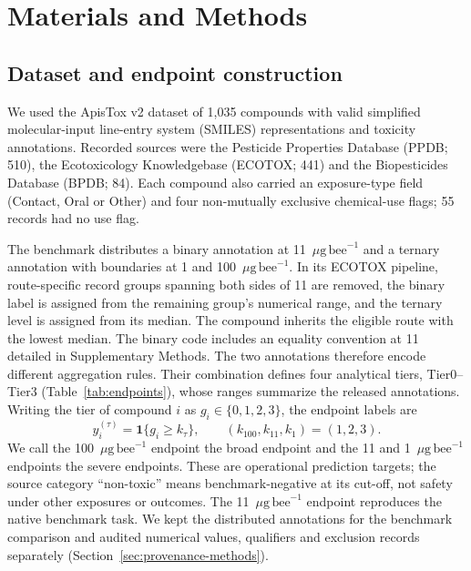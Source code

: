 \documentclass{ieeeaccess}
\newcommand{\ugbee}{\ensuremath{\mu\mathrm{g\,bee}^{-1}}\xspace}
\begin{document}
\section{Materials and Methods}
\subsection{Dataset and endpoint construction}
We used the ApisTox v2 dataset of 1,035 compounds with valid simplified molecular-input line-entry system (SMILES) representations and toxicity annotations\cite{Adamczyk2025}. Recorded sources were the Pesticide Properties Database (PPDB; 510)\cite{Lewis2016}, the Ecotoxicology Knowledgebase (ECOTOX; 441) and the Biopesticides Database (BPDB; 84). Each compound also carried an exposure-type field (Contact, Oral or Other) and four non-mutually exclusive chemical-use flags; 55 records had no use flag.

The benchmark distributes a binary annotation at 11~\ugbee and a ternary annotation with boundaries at 1 and 100~\ugbee\cite{Adamczyk2025}. In its ECOTOX pipeline, route-specific record groups spanning both sides of 11 are removed, the binary label is assigned from the remaining group's numerical range, and the ternary level is assigned from its median. The compound inherits the eligible route with the lowest median. The binary code includes an equality convention at 11 detailed in Supplementary Methods. The two annotations therefore encode different aggregation rules. Their combination defines four analytical tiers, Tier0--Tier3 (Table~\ref{tab:endpoints}), whose ranges summarize the released annotations. Writing the tier of compound \(i\) as \(g_i\in\{0,1,2,3\}\), the endpoint labels are
\begin{equation}
y_i^{(\tau)}=\mathbf{1}\{g_i\geq k_\tau\},\qquad
(k_{100},k_{11},k_1)=(1,2,3).
\label{eq:endpoint-map}
\end{equation}
We call the 100~\ugbee endpoint the broad endpoint and the 11 and 1~\ugbee endpoints the severe endpoints. These are operational prediction targets; the source category ``non-toxic'' means benchmark-negative at its cut-off, not safety under other exposures or outcomes. The 11~\ugbee endpoint reproduces the native benchmark task. We kept the distributed annotations for the benchmark comparison and audited numerical values, qualifiers and exclusion records separately (Section~\ref{sec:provenance-methods}).
\end{document}
